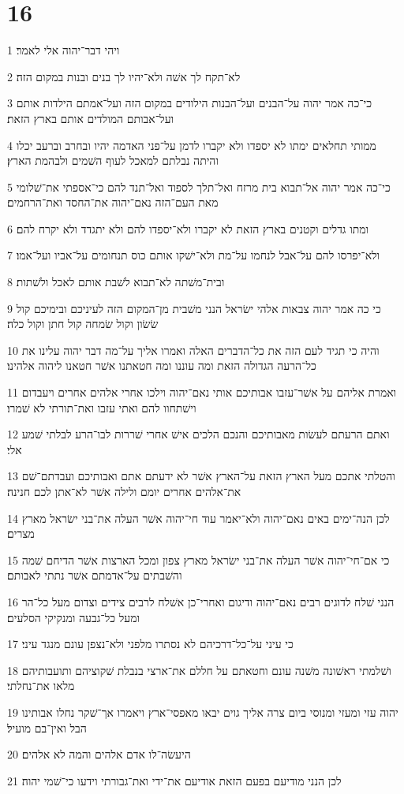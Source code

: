 \chapter{16}

\par 1 ויהי דבר־יהוה אלי לאמר׃
\par 2 לא־תקח לך אשׁה ולא־יהיו לך בנים ובנות במקום הזה׃
\par 3 כי־כה אמר יהוה על־הבנים ועל־הבנות הילודים במקום הזה ועל־אמתם הילדות אותם ועל־אבותם המולדים אותם בארץ הזאת׃
\par 4 ממותי תחלאים ימתו לא יספדו ולא יקברו לדמן על־פני האדמה יהיו ובחרב וברעב יכלו והיתה נבלתם למאכל לעוף השׁמים ולבהמת הארץ׃
\par 5 כי־כה אמר יהוה אל־תבוא בית מרזח ואל־תלך לספוד ואל־תנד להם כי־אספתי את־שׁלומי מאת העם־הזה נאם־יהוה את־החסד ואת־הרחמים׃
\par 6 ומתו גדלים וקטנים בארץ הזאת לא יקברו ולא־יספדו להם ולא יתגדד ולא יקרח להם׃
\par 7 ולא־יפרסו להם על־אבל לנחמו על־מת ולא־ישׁקו אותם כוס תנחומים על־אביו ועל־אמו׃
\par 8 ובית־משׁתה לא־תבוא לשׁבת אותם לאכל ולשׁתות׃
\par 9 כי כה אמר יהוה צבאות אלהי ישׂראל הנני משׁבית מן־המקום הזה לעיניכם ובימיכם קול שׂשׂון וקול שׂמחה קול חתן וקול כלה׃
\par 10 והיה כי תגיד לעם הזה את כל־הדברים האלה ואמרו אליך על־מה דבר יהוה עלינו את כל־הרעה הגדולה הזאת ומה עוננו ומה חטאתנו אשׁר חטאנו ליהוה אלהינו׃
\par 11 ואמרת אליהם על אשׁר־עזבו אבותיכם אותי נאם־יהוה וילכו אחרי אלהים אחרים ויעבדום וישׁתחוו להם ואתי עזבו ואת־תורתי לא שׁמרו׃
\par 12 ואתם הרעתם לעשׂות מאבותיכם והנכם הלכים אישׁ אחרי שׁררות לבו־הרע לבלתי שׁמע אלי׃
\par 13 והטלתי אתכם מעל הארץ הזאת על־הארץ אשׁר לא ידעתם אתם ואבותיכם ועבדתם־שׁם את־אלהים אחרים יומם ולילה אשׁר לא־אתן לכם חנינה׃
\par 14 לכן הנה־ימים באים נאם־יהוה ולא־יאמר עוד חי־יהוה אשׁר העלה את־בני ישׂראל מארץ מצרים׃
\par 15 כי אם־חי־יהוה אשׁר העלה את־בני ישׂראל מארץ צפון ומכל הארצות אשׁר הדיחם שׁמה והשׁבתים על־אדמתם אשׁר נתתי לאבותם׃
\par 16 הנני שׁלח לדוגים רבים נאם־יהוה ודיגום ואחרי־כן אשׁלח לרבים צידים וצדום מעל כל־הר ומעל כל־גבעה ומנקיקי הסלעים׃
\par 17 כי עיני על־כל־דרכיהם לא נסתרו מלפני ולא־נצפן עונם מנגד עיני׃
\par 18 ושׁלמתי ראשׁונה משׁנה עונם וחטאתם על חללם את־ארצי בנבלת שׁקוציהם ותועבותיהם מלאו את־נחלתי׃
\par 19 יהוה עזי ומעזי ומנוסי ביום צרה אליך גוים יבאו מאפסי־ארץ ויאמרו אך־שׁקר נחלו אבותינו הבל ואין־בם מועיל׃
\par 20 היעשׂה־לו אדם אלהים והמה לא אלהים׃
\par 21 לכן הנני מודיעם בפעם הזאת אודיעם את־ידי ואת־גבורתי וידעו כי־שׁמי יהוה׃

